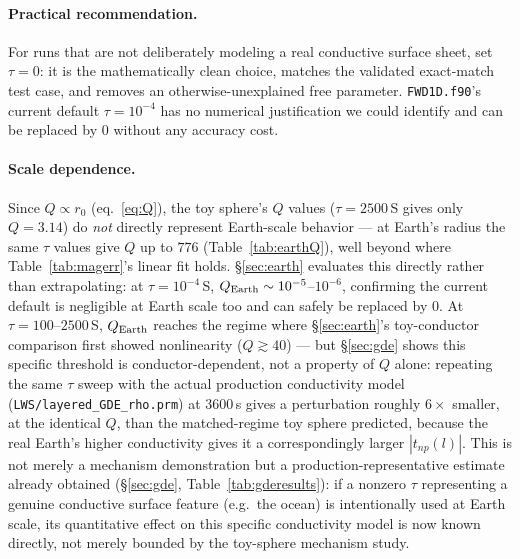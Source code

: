 \documentclass[11pt]{article}
\begin{document}
\paragraph{Practical recommendation.} For runs that are not deliberately modeling a real conductive
surface sheet, set $\tau=0$: it is the mathematically clean choice, matches the validated exact-match
test case, and removes an otherwise-unexplained free parameter. \texttt{FWD1D.f90}'s current default
$\tau=10^{-4}$ has no numerical justification we could identify and can be replaced by $0$ without
any accuracy cost.

\paragraph{Scale dependence.} Since $Q\propto r_0$ (eq.~\ref{eq:Q}), the toy sphere's $Q$ values
($\tau=2500$\,S gives only $Q=3.14$) do \emph{not} directly represent Earth-scale behavior --- at
Earth's radius the same $\tau$ values give $Q$ up to $776$ (Table~\ref{tab:earthQ}), well beyond
where Table~\ref{tab:magerr}'s linear fit holds. \S\ref{sec:earth} evaluates this directly rather
than extrapolating: at $\tau=10^{-4}$\,S, $Q_{\rm Earth}\sim10^{-5}$--$10^{-6}$, confirming the
current default is negligible at Earth scale too and can safely be replaced by $0$. At
$\tau=100$--$2500$\,S, $Q_{\rm Earth}$ reaches the regime where \S\ref{sec:earth}'s toy-conductor
comparison first showed nonlinearity ($Q\gtrsim40$) --- but \S\ref{sec:gde} shows this specific
threshold is conductor-dependent, not a property of $Q$ alone: repeating the same $\tau$ sweep with
the actual production conductivity model (\texttt{LWS/layered\_GDE\_rho.prm}) at 3600\,s gives a
perturbation roughly $6\times$ smaller, at the identical $Q$, than the matched-regime toy sphere
predicted, because the real Earth's higher conductivity gives it a correspondingly larger
$|t_{np}(l)|$. This is not merely a mechanism demonstration but a production-representative estimate
already obtained (\S\ref{sec:gde}, Table~\ref{tab:gderesults}): if a nonzero $\tau$ representing a
genuine conductive surface feature (e.g.\ the ocean) is intentionally used at Earth scale, its
quantitative effect on this specific conductivity model is now known directly, not merely bounded by
the toy-sphere mechanism study.
\end{document}
